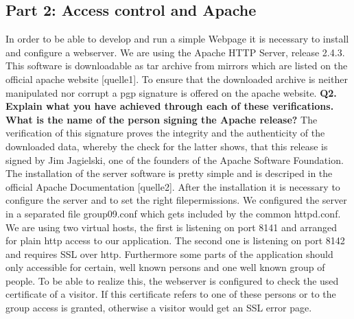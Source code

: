 \subsection {Part 2: Access control and Apache}

\newline
\noindent
In order to be able to develop and run a simple Webpage it is necessary to install and configure a webserver. 
We are using  the Apache HTTP Server, release 2.4.3. This software is downloadable as tar archive from mirrors 
which are listed on the official apache website [quelle1]. To ensure that the downloaded archive is neither manipulated 
nor corrupt a pgp signature is offered on the apache website. 
\newline
\noindent
{\bf Q2. Explain what you have achieved through each of these verifications.
What is the name of the person signing the Apache release?}
\newline
\noindent
The verification of this signature proves the integrity and the authenticity of the downloaded data, 
whereby the check for the latter shows, that this release is signed by Jim Jagielski, 
one of the founders of the Apache Software Foundation. 
\newline
\noindent
The installation of the server software is pretty simple and is descriped in the official Apache Documentation [quelle2].
After the installation it is necessary to configure the server and to set the right filepermissions. 
We configured the server in a separated file group09.conf which gets included by the common httpd.conf. 
We are using two virtual hosts, the first is listening on port 8141 and arranged for plain http access to our application.
The second one is listening on port 8142 and requires SSL over http. 
Furthermore some parts of the application should only accessible for certain, 
well known persons and one well known group of people. To be able to realize this, 
the webserver is configured to check the used certificate of a visitor. 
If this certificate refers to one of these persons or to the group access is granted, 
otherwise a visitor would get an SSL error page. 

